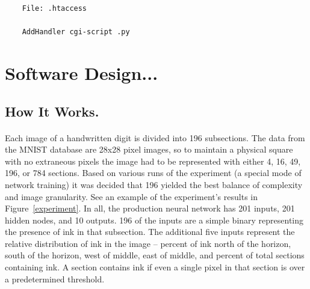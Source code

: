 \documentclass{article}
\begin{document}
    \begin{lstlisting}
    File: .htaccess

    AddHandler cgi-script .py
    \end{lstlisting}

\section{Software Design...}

\subsection{How It Works.}

    \paragraph{}Each image of a handwritten digit is divided into 196 subsections.
    The data from the MNIST database are 28x28 pixel images, so to maintain a
    physical square with no extraneous pixels the image had to be represented with
    either 4, 16, 49, 196, or 784 sections. Based on various runs of the 
    experiment (a special mode of network training) it was decided that 196
    yielded the best balance of complexity and image granularity. See an example
    of the experiment's results in Figure~\ref{experiment}. In all, the 
    production neural network has 201 inputs, 201 hidden nodes, and 10 outputs. 
    196 of the inputs are a simple binary representing the presence of ink in 
    that subsection. The additional five inputs represent the relative 
    distribution of ink in the image -- percent of ink north of the horizon, 
    south of the horizon, west of middle, east of middle, and percent of total 
    sections containing ink. A section contains ink if even a single pixel in 
    that section is over a predetermined threshold.
\end{document}
